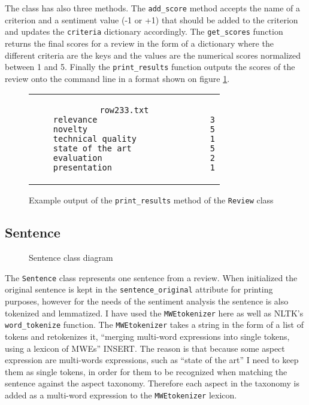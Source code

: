 The class has also three methods. The \texttt{add\_score} method accepts the name of a criterion and a sentiment value (-1 or +1) that should be added to the criterion and updates the \texttt{criteria} dictionary accordingly. The \texttt{get\_scores} function returns the final scores for a review in the form of a dictionary where the different criteria are the keys and the values are the numerical scores normalized between 1 and 5. Finally the \texttt{print\_results} function outputs the scores of the review onto the command line in a format shown on figure \ref{img:r_results}.
\begin{figure}[!htb]
\centering
\begin{tabular}{c}
\begin{lstlisting}
row233.txt
	relevance                       3
	novelty                         5
	technical quality               1
	state of the art                5
	evaluation                      2
	presentation                    1
\end{lstlisting}
\end{tabular}
\caption{Example output of the \texttt{print\_results} method of the \texttt{Review} class}
\label{img:r_results}
\end{figure}

\subsection{Sentence}
\begin{figure}[H]
\centering
{}
\caption{Sentence class diagram}
\label{img:sentence}
\end{figure}

The \texttt{Sentence} class represents one sentence from a review. When initialized the original sentence is kept in the \texttt{sentence\_original} attribute for printing purposes, however for the needs of the sentiment analysis the sentence is also tokenized and lemmatized. I have used the \texttt{MWEtokenizer} here as well as NLTK's \texttt{word\_tokenize} function. The \texttt{MWEtokenizer} takes a string in the form of a list of tokens and
retokenizes it, ``merging multi-word expressions into single tokens, using a lexicon of MWEs'' INSERT. The reason is that because some aspect expression are multi-words expressions, such as ``state of the art'' I need to keep them as single tokens, in order for them to be recognized when matching the sentence against the aspect taxonomy. Therefore each aspect in the taxonomy is added as a multi-word expression to the \texttt{MWEtokenizer} lexicon. 

